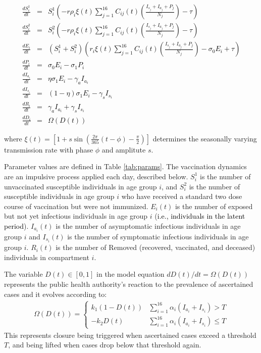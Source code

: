 \textcolor{black}{\begin{eqnarray}
\frac{dS^1_i}{dt} &= & S^1_i \left(- r \rho_i  \xi(t) \sum_{j=1}^{16} C_{ij}(t) \left(\frac{I_{s_j} + I_{a_j} + P_j}{N_j}\right) - \tau\right) \label{S1eqn} \\
\frac{dS^2_i}{dt} &= & S^2_i \left(- r \rho_i  \xi(t) \sum_{j=1}^{16} C_{ij}(t) \left(\frac{I_{s_j} + I_{a_j}+ P_j}{N_j}\right)  - \tau \right)  \label{S2eqn} \\
\frac{dE_i}{dt} &= &  (S^1_i + S^2_i) \left(r_i  \xi(t) \sum_{j=1}^{16} C_{ij}(t) \left(\frac{I_{s_j} + I_{a_j}+ P_j}{N_j}\right) - \sigma_0 E_i + \tau \right) \label{Eeqn} \\
\frac{dP_i}{dt} &= & \sigma_0 E_i - \sigma_1 P_i \label{Peqn} \\
\frac{dI_{a_i}}{dt} &= & \eta \sigma_1 E_i - \gamma_a I_{a_i}\label{Ieqn} \\
\frac{dI_{s_i}}{dt} &= & (1 - \eta) \sigma_1 E_i - \gamma_s I_{s_i} \label{Ieqn} \\
\frac{dR_i}{dt} &= & \gamma_a I_{a_i} + \gamma_s I_{s_i}  \label{Reqn} \\
\frac{dD_i}{dt} &= & \Omega(D(t)) \label{Deqn}
\end{eqnarray}}

where $\xi(t) = \left[1 + s \sin\left(\frac{2 \pi}{365} (t - \phi) - \frac{\pi}{2}\right)\right]$ determines the seasonally varying transmission rate with phase $\phi$ and amplitute $s$.

\noindent Parameter values are defined in Table \ref{tab:params}. The vaccination dynamics are an impulsive process applied each day, described below. $S^{1}_i$ is the number of unvaccinated susceptible individuals in age group $i$, and $S^{2}_i$ is the number of susceptible individuals in age group $i$ who have received a standard two dose course of vaccination but were not immunized. $E_i(t)$ is the number of exposed but not yet infectious individuals in age group $i$ (\textcolor{black}{i.e., individuals in the latent period}). $I_{a_i}(t)$ is the number of asymptomatic infectious individuals in age group $i$ and $I_{s_i}(t)$ is the number of symptomatic infectious individuals in age group $i$. $R_i(t)$ is the number of Removed (recovered, vaccinated, and deceased) individuals in compartment $i$.

The variable $D(t) \in [0,1]$ in the model equation $dD(t)/dt = \Omega(D(t))$ represents the public health authority's reaction to the prevalence of ascertained cases and it evolves according to: 
\begin{eqnarray}
  \Omega(D(t)) =  \left\{
\begin{array}{ll}
    k_1 (1 - D(t)) &  \sum_{i=1}^{16}\alpha_i(I_{a_i} + I_{s_i}) > T\\
    - k_2 D(t) & \sum_{i=1}^{16}\alpha_i(I_{a_i} + I_{s_i}) \leq T
\end{array} 
\right. 
\end{eqnarray}
This represents closure being triggered when ascertained cases exceed a threshold $T$, and being lifted when cases drop below that threshold again. 


